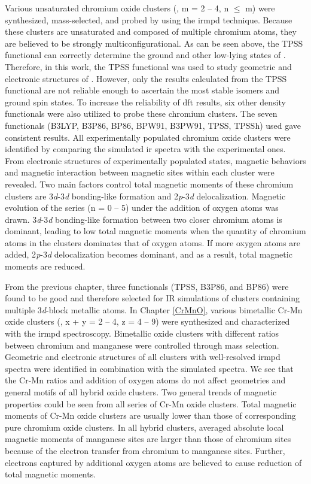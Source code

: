 \begin{refsection}
Various unsaturated chromium oxide clusters (, m = 2 -- 4, n $\leq$ m) were synthesized, mass-selected, and probed by using the \acrshort{irmpd} technique. Because these clusters are unsaturated and composed of multiple chromium atoms, they are believed to be strongly multiconfigurational. As can be seen above, the TPSS functional can correctly determine the ground and other low-lying states of . Therefore, in this work, the TPSS functional was used to study geometric and electronic structures of . However, only the results calculated from the TPSS functional are not reliable enough to ascertain the most stable isomers and ground spin states. To increase the reliability of \acrshort{dft} results, six other density functionals were also utilized to probe these chromium clusters. The seven functionals (B3LYP, B3P86, BP86, BPW91, B3PW91, TPSS, TPSSh) used gave consistent results. All experimentally populated chromium oxide clusters were identified by comparing the simulated \acrshort{ir} spectra with the experimental ones. From electronic structures of experimentally populated states, magnetic behaviors and magnetic interaction between magnetic sites within each cluster were revealed. Two main factors control total magnetic moments of these chromium clusters are 3\textit{d}-3\textit{d} bonding-like formation and 2\textit{p}-3\textit{d} delocalization. Magnetic evolution of the series  (n = 0 -- 5) under the addition of oxygen atoms was drawn. 3\textit{d}-3\textit{d} bonding-like formation between two closer chromium atoms is dominant, leading to low total magnetic moments when the quantity of chromium atoms in the clusters dominates that of oxygen atoms. If more oxygen atoms are added, 2\textit{p}-3\textit{d} delocalization becomes dominant, and as a result, total magnetic moments are reduced. 



From the previous chapter, three functionals (TPSS, B3P86, and BP86) were found to be good and therefore selected for IR simulations of clusters containing multiple 3\textit{d}-block metallic atoms. In Chapter \ref{CrMnO}, various bimetallic Cr-Mn oxide clusters (, x + y = 2 -- 4, z = 4 -- 9) were synthesized and characterized with the \acrshort{irmpd} spectroscopy. Bimetallic oxide clusters with different ratios between chromium and manganese were controlled through mass selection. Geometric and electronic structures of all clusters with well-resolved \acrshort{irmpd} spectra were identified in combination with the simulated spectra. We see that the Cr-Mn ratios and addition of oxygen atoms do not affect geometries and general motifs of all hybrid oxide clusters. Two general trends of magnetic properties could be seen from all series of Cr-Mn oxide clusters. Total magnetic moments of Cr-Mn oxide clusters are usually lower than those of corresponding pure chromium oxide clusters. In all hybrid clusters, averaged absolute local magnetic moments of manganese sites are larger than those of chromium sites because of the electron transfer from chromium to manganese sites. Further, electrons captured by additional oxygen atoms are believed to cause reduction of total magnetic moments.  





\end{refsection}
